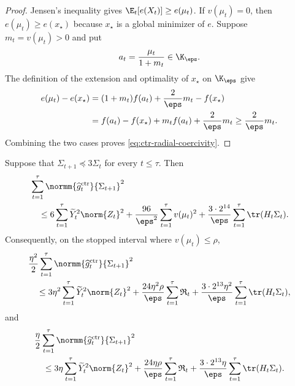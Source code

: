 \begin{proof}
    Jensen's inequality gives $\E_t[e(X_t)]\geq e(\mu_t)$.  If
    $v(\mu_t)=0$, then $e(\mu_t)\geq e(x_\star)$ because $x_\star$ is a
    global minimizer of $e$.  Suppose $m_t=v(\mu_t)>0$ and put
    \begin{align}
        a_t=\frac{\mu_t}{1+m_t}\in\K_\eps.
    \end{align}
    The definition of the extension and optimality of $x_\star$ on
    $\K_\eps$ give
    \begin{align}
        e(\mu_t)-e(x_\star)
         & =(1+m_t)f(a_t)+\frac2\eps m_t-f(x_\star)
        \\
         & =f(a_t)-f(x_\star)+m_tf(a_t)+\frac2\eps m_t
        \geq\frac2\eps m_t.
    \end{align}
    Combining the two cases proves \eqref{eq:ctr-radial-coercivity}.
\end{proof}

\begin{lemma}
    \label{lem:ctr-gradient-energy}
    Suppose that $\Sigma_{t+1}\preceq3\Sigma_t$ for every $t\leq\tau$.
    Then
    \begin{align}
         & \sum_{t=1}^{\tau}
        \normm{\widehat g_t^{\mathrm{ctr}}}{\Sigma_{t+1}}^2
        \nonumber            \\
         & \quad\leq
        6\sum_{t=1}^{\tau}\widetilde Y_t^2\norm{Z_t}^2
        +\frac{96}{\eps^2}\sum_{t=1}^{\tau}v(\mu_t)^2
        +\frac{3\cdot2^{14}}\eps
        \sum_{t=1}^{\tau}\tr(H_t\Sigma_t).
        \label{eq:ctr-full-gradient-energy}
    \end{align}
    Consequently, on the stopped interval where $v(\mu_t)\leq\rho$,
    \begin{align}
         & \frac{\eta^2}{2}
        \sum_{t=1}^{\tau}
        \normm{\widehat g_t^{\mathrm{ctr}}}{\Sigma_{t+1}}^2
        \nonumber           \\
         & \quad\leq
        3\eta^2\sum_{t=1}^{\tau}
        \widetilde Y_t^2\norm{Z_t}^2
        +\frac{24\eta^2\rho}{\eps}
        \sum_{t=1}^{\tau}\mathfrak R_t
        +\frac{3\cdot2^{13}\eta^2}\eps
        \sum_{t=1}^{\tau}\tr(H_t\Sigma_t),
        \label{eq:ctr-focus-energy}
    \end{align}
    and
    \begin{align}
         & \frac\eta2
        \sum_{t=1}^{\tau}
        \normm{\widehat g_t^{\mathrm{ctr}}}{\Sigma_{t+1}}^2
        \nonumber     \\
         & \quad\leq
        3\eta\sum_{t=1}^{\tau}
        \widetilde Y_t^2\norm{Z_t}^2
        +\frac{24\eta\rho}{\eps}
        \sum_{t=1}^{\tau}\mathfrak R_t
        +\frac{3\cdot2^{13}\eta}\eps
        \sum_{t=1}^{\tau}\tr(H_t\Sigma_t).
        \label{eq:ctr-regret-energy}
    \end{align}
\end{lemma}

